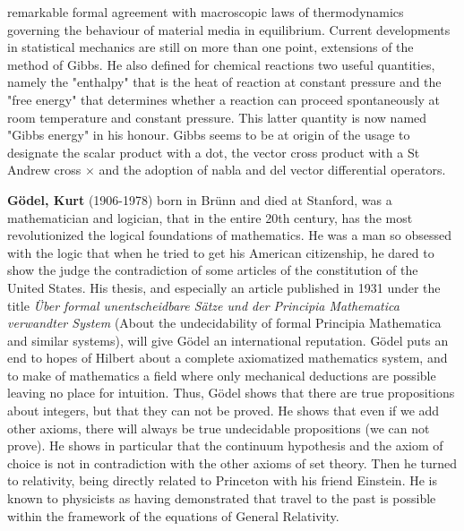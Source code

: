remarkable formal agreement with macroscopic laws of thermodynamics governing the behaviour of material media in equilibrium. Current developments in statistical mechanics are still on more than one point, extensions of the method of Gibbs. He also defined for chemical reactions two useful quantities, namely the "enthalpy" that is the heat of reaction at constant pressure and the "free energy" that determines whether a reaction can proceed spontaneously at room temperature and constant pressure. This latter quantity is now named "Gibbs energy" in his honour. Gibbs seems to be at origin of the usage to designate the scalar product with a dot, the vector cross product with a St Andrew cross $\times$ and the adoption of nabla and del vector differential operators.

\textbf{Gödel, Kurt} (1906-1978) born in Brünn and died at Stanford, was a mathematician and logician, that in the entire 20th century, has the most revolutionized the logical foundations of mathematics. He was a man so obsessed with the logic that when he tried to get his American citizenship, he dared to show the judge the contradiction of some articles of the constitution of the United States. His thesis, and especially an article published in 1931 under the title \textit{Über formal unentscheidbare Sätze und der Principia Mathematica verwandter System} (About the undecidability of formal Principia Mathematica and similar systems), will give Gödel an international reputation. Gödel puts an end to hopes of Hilbert about a complete axiomatized mathematics system, and to make of mathematics a field where only mechanical deductions are possible leaving no place for intuition. Thus, Gödel shows that there are true propositions about integers, but that they can not be proved. He shows that even if we add other axioms, there will always be true undecidable propositions (we can not prove). He shows in particular that the continuum hypothesis and the axiom of choice is not in contradiction with the other axioms of set theory. Then he turned to relativity, being directly related to Princeton with his friend Einstein. He is known to physicists as having demonstrated that travel to the past is possible within the framework of the equations of General Relativity.

